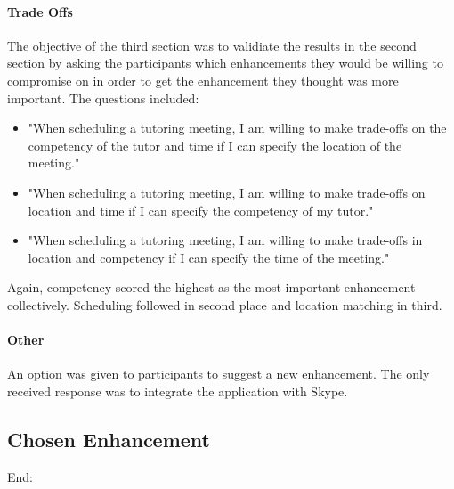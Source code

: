 \paragraph{Trade Offs} The objective of the third section was to
validiate the results in the second section by asking the participants
which enhancements they would be willing to compromise on in order to
get the enhancement they thought was more important. The questions
included:
\begin{itemize}
  \item "When scheduling a tutoring meeting, I am willing to make
trade-offs on the competency of the tutor and time if I can specify
the location of the meeting."
  \item "When scheduling a tutoring meeting, I am willing to make
trade-offs on location and time if I can specify the competency of my
tutor."
  \item "When scheduling a tutoring meeting, I am willing to make
trade-offs in location and competency if I can specify the time of the
meeting."
\end{itemize} Again, competency scored the highest as the most
important enhancement collectively. Scheduling followed in second
place and location matching in third.

\paragraph{Other} An option was given to participants to suggest a new
enhancement. The only received response was to integrate the
application with Skype.

\subsection{Chosen Enhancement}
\label{sec:chosen-enhancement}

End:
